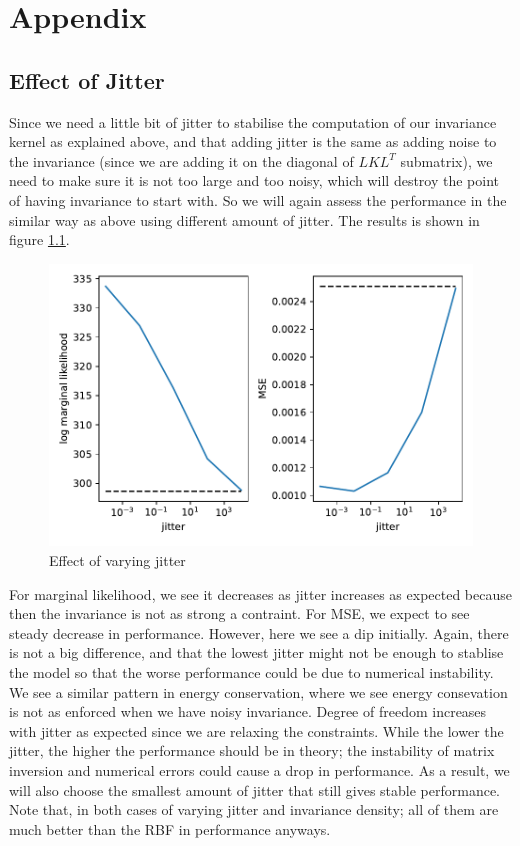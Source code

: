 \documentclass{statsmsc}
\begin{document}
\chapter{Appendix}

\section{Effect of Jitter}
Since we need a little bit of jitter to stabilise the computation of our invariance kernel as explained above, and that adding jitter is the same as adding noise to the invariance (since we are adding it on the diagonal of $LKL^T$ submatrix), we need to make sure it is not too large and too noisy, which will destroy the point of having invariance to start with. 
So we will again assess the performance in the similar way as above using different amount of jitter.
The results is shown in figure \ref{fig:vary_jitter}.

\begin{figure}[H] 
  \includegraphics[width=0.8\linewidth]{../codes/figures/vary_jitter.pdf}
  \centering
  \caption{Effect of varying jitter}
  \label{fig:vary_jitter}
\end{figure}

For marginal likelihood, we see it decreases as jitter increases as expected because then the invariance is not as strong a contraint.
For MSE, we expect to see steady decrease in performance.
However, here we see a dip initially.
Again, there is not a big difference, and that the lowest jitter might not be enough to stablise the model so that the worse performance could be due to numerical instability.
We see a similar pattern in energy conservation, where we see energy consevation is not as enforced when we have noisy invariance.
Degree of freedom increases with jitter as expected since we are relaxing the constraints.
While the lower the jitter, the higher the performance should be in theory; the instability of matrix inversion and numerical errors could cause a drop in performance.
As a result,  we will also choose the smallest amount of jitter that still gives stable performance.  
Note that, in both cases of varying jitter and invariance density; all of them are much better than the RBF in performance anyways.
\end{document}
